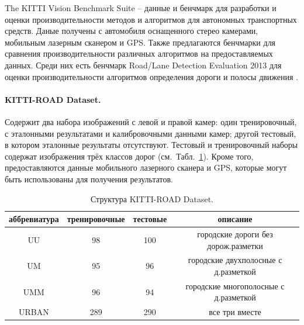 \documentclass[oneside,final,12pt]{scrartcl}
\begin{document}
	 		The KITTI Vision Benchmark Suite -- данные и бенчмарк для разработки и оценки производительности методов и алгоритмов для автономных транспортных средств. Даные получены с автомобиля оснащенного стерео камерами, мобильным лазерным сканером и GPS. Также предлагаются бенчмарки для сравнения производительности различных алгоритмов на предоставляемых данных. Среди них есть бенчмарк Road/Lane Detection Evaluation 2013 для оценки производительности алгоритмов определения дороги и полосы движения \cite{Fritsch2013}.

	 		\paragraph{KITTI-ROAD Dataset.}
 			Содержит два набора изображений с левой и правой камер: один тренировочный, с эталонными результатами и калибровочными данными камер; другой тестовый, в котором эталонные результаты отсутствуют. Тестовый и тренировочный наборы содержат изображения трёх классов дорог (см.~Табл.~\ref{tb:kitti_data}). Кроме того,  предоставляются данные мобильного лазерного сканера и GPS, которые могут быть использованы для получения результатов.

	 		\begin{table}
	 			\centering
		 		\caption{Структура KITTI-ROAD Dataset.}
		 		\label{tb:kitti_data}
		 		\begin{tabular}{|c|c|c|c|}
		 			\hline
		 			\textbf{аббревиатура} &  \textbf{тренировочные} & \textbf{тестовые} & \textbf{описание} \\
		 			\hline
		 			UU & 98 & 100 & городские дороги без дорож.разметки \\

		 			UM & 95 & 96 & городские двухполосные с д.разметкой \\

		 			UMM & 96 & 94 & городские многополосные с д.разметкой \\
		 			\hline
		 			URBAN & 289 & 290 & все три вместе \\
		 			\hline
		 		\end{tabular}
 			\end{table}
\end{document}
